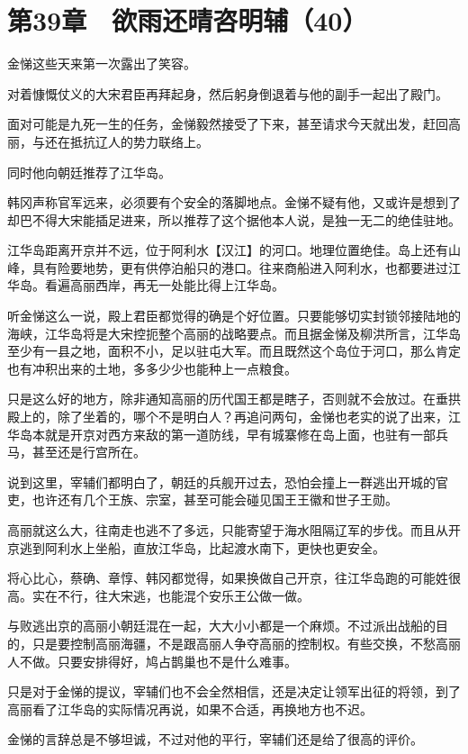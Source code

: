 \section{第39章　欲雨还晴咨明辅（40）}

金悌这些天来第一次露出了笑容。

对着慷慨仗义的大宋君臣再拜起身，然后躬身倒退着与他的副手一起出了殿门。

面对可能是九死一生的任务，金悌毅然接受了下来，甚至请求今天就出发，赶回高丽，与还在抵抗辽人的势力联络上。

同时他向朝廷推荐了江华岛。

韩冈声称官军远来，必须要有个安全的落脚地点。金悌不疑有他，又或许是想到了却巴不得大宋能插足进来，所以推荐了这个据他本人说，是独一无二的绝佳驻地。

江华岛距离开京并不远，位于阿利水【汉江】的河口。地理位置绝佳。岛上还有山峰，具有险要地势，更有供停泊船只的港口。往来商船进入阿利水，也都要进过江华岛。看遍高丽西岸，再无一处能比得上江华岛。

听金悌这么一说，殿上君臣都觉得的确是个好位置。只要能够切实封锁邻接陆地的海峡，江华岛将是大宋控扼整个高丽的战略要点。而且据金悌及柳洪所言，江华岛至少有一县之地，面积不小，足以驻屯大军。而且既然这个岛位于河口，那么肯定也有冲积出来的土地，多多少少也能种上一点粮食。

只是这么好的地方，除非通知高丽的历代国王都是瞎子，否则就不会放过。在垂拱殿上的，除了坐着的，哪个不是明白人？再追问两句，金悌也老实的说了出来，江华岛本就是开京对西方来敌的第一道防线，早有城寨修在岛上面，也驻有一部兵马，甚至还是行宫所在。

说到这里，宰辅们都明白了，朝廷的兵舰开过去，恐怕会撞上一群逃出开城的官吏，也许还有几个王族、宗室，甚至可能会碰见国王王徽和世子王勋。

高丽就这么大，往南走也逃不了多远，只能寄望于海水阻隔辽军的步伐。而且从开京逃到阿利水上坐船，直放江华岛，比起渡水南下，更快也更安全。

将心比心，蔡确、章惇、韩冈都觉得，如果换做自己开京，往江华岛跑的可能姓很高。实在不行，往大宋逃，也能混个安乐王公做一做。

与败逃出京的高丽小朝廷混在一起，大大小小都是一个麻烦。不过派出战船的目的，只是要控制高丽海疆，不是跟高丽人争夺高丽的控制权。有些交换，不愁高丽人不做。只要安排得好，鸠占鹊巢也不是什么难事。

只是对于金悌的提议，宰辅们也不会全然相信，还是决定让领军出征的将领，到了高丽看了江华岛的实际情况再说，如果不合适，再换地方也不迟。

金悌的言辞总是不够坦诚，不过对他的平行，宰辅们还是给了很高的评价。

